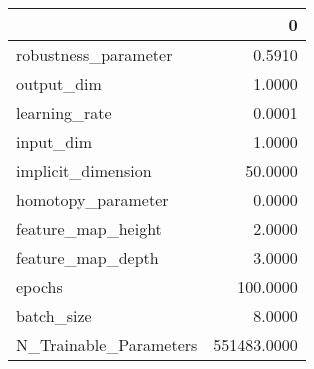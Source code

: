 \begin{tabular}{lr}
\toprule
{} &            0 \\
\midrule
robustness\_parameter   &       0.5910 \\
output\_dim             &       1.0000 \\
learning\_rate          &       0.0001 \\
input\_dim              &       1.0000 \\
implicit\_dimension     &      50.0000 \\
homotopy\_parameter     &       0.0000 \\
feature\_map\_height     &       2.0000 \\
feature\_map\_depth      &       3.0000 \\
epochs                 &     100.0000 \\
batch\_size             &       8.0000 \\
N\_Trainable\_Parameters &  551483.0000 \\
\bottomrule
\end{tabular}
